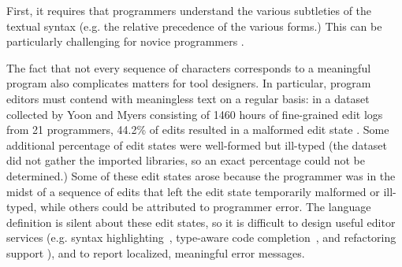 
First, it requires that programmers understand the various subtleties of the textual syntax (e.g. the relative precedence of the various forms.) This can be particularly challenging for novice programmers \cite{Altadmri:2015:MCI:2676723.2677258}. %

The fact that not every sequence of characters corresponds to a meaningful program also complicates matters for tool designers. In particular, program editors must contend with meaningless text on a regular basis: in a dataset collected by Yoon and Myers consisting of 1460 hours of fine-grained edit logs from 21 programmers, 44.2\% of edits resulted in a malformed edit state \cite{6883030}. Some additional percentage of edit states were well-formed but ill-typed (the dataset did not gather the imported libraries, so an exact percentage could not be determined.)  
Some of these edit states arose because the programmer was in the midst of a sequence of edits that left the edit state temporarily malformed or ill-typed, while others could be attributed to programmer error. The language definition is silent about these edit states, so it is difficult to design useful editor services (e.g. syntax highlighting~\cite{sarkar2015impact}, type-aware code completion~\cite{Mooty:2010:CCC:1915084.1916348,Omar:2012:ACC:2337223.2337324}, and refactoring support ), and to report localized, meaningful error messages.

